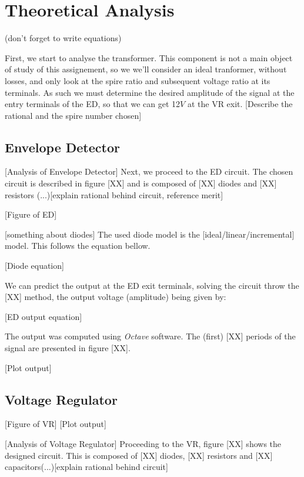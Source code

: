 \section{Theoretical Analysis}
\label{sec:theoretical}

(don't forget to write equations)

First, we start to analyse the transformer. This component is not a main object of study of this assignement, so we we'll consider an ideal tranformer, without losses, and only look at the spire ratio and subsequent voltage ratio at its terminals. As such we must determine the desired amplitude of the signal at the entry terminals of the ED, so that we can get 12$V$ at the VR exit. [Describe the rational and the spire number chosen]  %


\subsection{Envelope Detector}
[Analysis of Envelope Detector]
Next, we proceed to the ED circuit. The chosen circuit is described in figure [XX] and is composed of [XX] diodes and [XX] resistors (...)[explain rational behind circuit, reference merit]

[Figure of ED]

[something about diodes]
The used diode model is the [ideal/linear/incremental] model. This follows the equation bellow.

[Diode equation] 

We can predict the output at the ED exit terminals, solving the circuit throw the [XX] method, the output voltage (amplitude) being given by:

[ED output equation]

The output was computed using \textit{Octave} software. The (first) [XX] periods of the signal are presented in figure [XX].

[Plot output]


\subsection{Voltage Regulator}
[Figure of VR]
[Plot output]

[Analysis of Voltage Regulator]
Proceeding to the VR, figure [XX] shows the designed circuit. This is composed of [XX] diodes, [XX] resistors and [XX] capacitors(...)[explain rational behind circuit]

